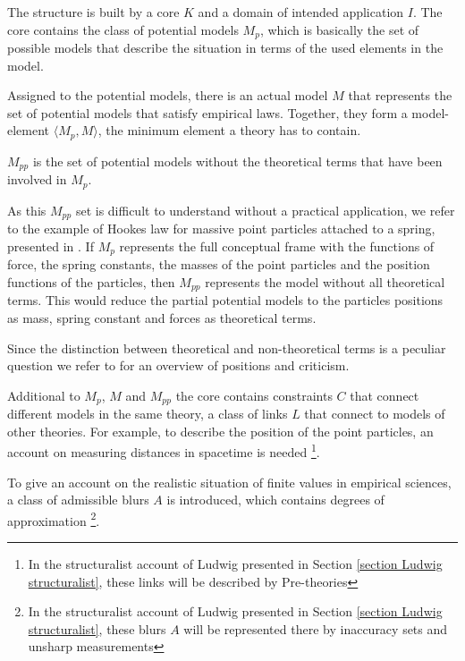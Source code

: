\documentclass{article}
\begin{document}
The structure is built by a core $K$ and a domain of intended application $I$. The core contains the class of potential models $M_p$, which is basically the set of possible models that describe the situation in terms of the used elements in the model. \newline

Assigned to the potential models, there is an actual model $M$ that represents the set of potential models that satisfy empirical laws. Together, they form a model-element $ \langle M_p,M \rangle $, the minimum element a theory has to contain.  \newline

$M_{pp}$ is the set of potential models without the theoretical terms that have been involved in $M_p$. 

As this $M_{pp}$ set is difficult to understand without a practical application, we refer to the example of Hookes law for massive point particles attached to a spring, presented in \cite[]{sep-physics-structuralism}. If $M_p$ represents the full conceptual frame with the functions of force, the spring constants, the masses of the point particles and the position functions of the particles, then $M_{pp}$ represents the model without all theoretical terms. This would reduce the partial potential models to the particles positions as mass, spring constant and forces as theoretical terms. \newline

Since the distinction between theoretical and non-theoretical terms is a peculiar question we refer to \cite[]{sep-theoretical-terms-science} for an overview of positions and criticism. \newline

Additional to $M_p$, $M$ and $M_{pp}$ the core contains constraints $C$ that connect different models in the same theory, a class of links $L$ that connect to models of other theories. For example, to describe the position of the point particles, an account on measuring distances in spacetime is needed \footnote{In the structuralist account of Ludwig presented in Section \ref{section Ludwig structuralist}, these links will be described by Pre-theories}. \newline

To give an account on the realistic situation of finite values in empirical sciences, a class of admissible blurs $A$ is introduced, which contains degrees of approximation \footnote{In the structuralist account of Ludwig presented in Section \ref{section Ludwig structuralist}, these blurs $A$ will be represented there by inaccuracy sets and unsharp measurements}. \newline
\end{document}
